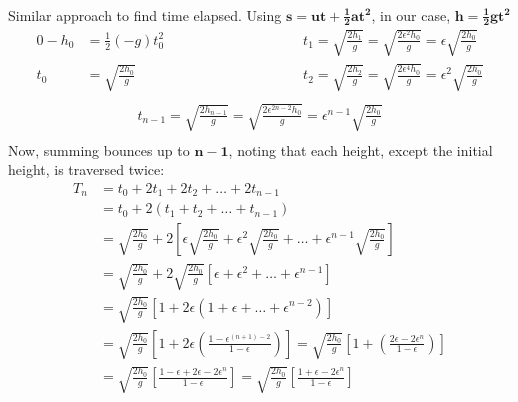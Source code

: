 \documentclass[]{article}
\begin{document}
{\begin{enumerate}[label=\roman*,topsep=0pt]
			\\
			Similar approach to find time elapsed. Using $\bm{s = ut + \frac{1}{2}at^2}$, in our case, $\bm{h = \frac{1}{2}gt^2}$
			\begin{equation*}
				\begin{aligned}
					0 - h_0 &= \frac{1}{2}(-g)t_0^2 & \hspace{100pt} & t_1 = \sqrt{\frac{2h_1}{g}} = \sqrt{\frac{2\epsilon^2 h_0}{g}} = \epsilon \sqrt{\frac{2h_0}{g}} \\
					t_0 &= \sqrt{\frac{2h_0}{g}} & \hspace{100pt} & t_2 = \sqrt{\frac{2h_2}{g}} = \sqrt{\frac{2\epsilon^4 h_0}{g}} = \epsilon^2 \sqrt{\frac{2h_0}{g}} \\
				\end{aligned}
			\end{equation*}
			\begin{equation*}
				\begin{split}
					t_{n-1} = \sqrt{\frac{2h_{n-1}}{g}} = \sqrt{\frac{2\epsilon^{2n-2} h_0}{g}} = \epsilon^{n-1} \sqrt{\frac{2h_0}{g}} \\
				\end{split}
			\end{equation*}
			Now, summing bounces up to $\bm{n-1}$, noting that each height, except the initial height, is traversed twice:
			\begin{equation*}
				\begin{split}
					T_n &= t_0 + 2t_1 + 2t_2 + \dots + 2t_{n-1} \\
					&= t_0 + 2(t_1 + t_2 + \dots + t_{n-1}) \\
					&= \sqrt{\frac{2h_0}{g}} + 2\left[ \epsilon \sqrt{\frac{2h_0}{g}} + \epsilon^2 \sqrt{\frac{2h_0}{g}} + \dots + \epsilon^{n-1} \sqrt{\frac{2h_0}{g}} \right] \\
					&= \sqrt{\frac{2h_0}{g}} + 2\sqrt{\frac{2h_0}{g}} \left[ \epsilon + \epsilon^2 + \dots + \epsilon^{n-1} \right] \\
					&= \sqrt{\frac{2h_0}{g}} \left[ 1 + 2\epsilon \left( 1 + \epsilon + \dots + \epsilon^{n-2} \right) \right] \\
					&= \sqrt{\frac{2h_0}{g}} \left[ 1 + 2\epsilon \left( \frac{1 - \epsilon^{(n + 1) - 2}}{1 - \epsilon} \right) \right]
					= \sqrt{\frac{2h_0}{g}} \left[ 1 + \left( \frac{2\epsilon - 2\epsilon^n}{1 - \epsilon} \right) \right] \\
					&= \sqrt{\frac{2h_0}{g}} \left[ \frac{1 - \epsilon + 2\epsilon - 2\epsilon^n}{1 - \epsilon} \right] = \sqrt{\frac{2h_0}{g}} \left[ \frac{1 + \epsilon - 2\epsilon^n}{1 - \epsilon} \right] \\
				\end{split}
			\end{equation*}
		\end{enumerate}
	
}
\end{document}
